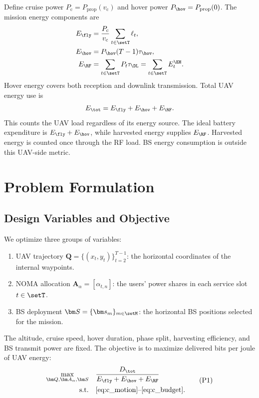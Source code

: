 Define cruise power $P_{\mathrm c}=P_{\mathrm{prop}}(v_{\mathrm c})$ and hover power $P_{\hov}=P_{\mathrm{prop}}(0)$. The mission energy components are
\begin{align}
E_{\fly}&=\frac{P_{\mathrm c}}{v_{\mathrm c}}\sum_{t\in\setT}\ell_t,
\label{eq:flight_energy}\\
E_{\hov}&=P_{\hov}(T-1)\tau_{\hov},\label{eq:hover_energy}\\
E_{\RF}&=\sum_{t\in\setT}P_t\tau_{\DL}
=\sum_{t\in\setT}E_t^{\EH}.\label{eq:rf_energy}
\end{align}
Hover energy covers both reception and downlink transmission. Total UAV energy use is
\begin{equation}
E_{\tot}=E_{\fly}+E_{\hov}+E_{\RF}.
\label{eq:total_energy}
\end{equation}
This counts the UAV load regardless of its energy source. The ideal battery expenditure is $E_{\fly}+E_{\hov}$, while harvested energy supplies $E_{\RF}$. Harvested energy is counted once through the RF load. BS energy consumption is outside this UAV-side metric.

\section{Problem Formulation}
\label{subsec:problem_formulation}
\subsection{Design Variables and Objective}
We optimize three groups of variables:
\begin{enumerate}
\item UAV trajectory $\bm Q=\{(x_t,y_t)\}_{t=2}^{T-1}$: the horizontal coordinates of the internal waypoints.
\item NOMA allocation $\bm A_{\alpha}=[\alpha_{t,n}]$: the users' power shares in each service slot $t\in\setT$.
\item BS deployment $\bm S=\{\bm s_m\}_{m\in\setM}$: the horizontal BS positions selected for the mission.
\end{enumerate}
The altitude, cruise speed, hover duration, phase split, harvesting efficiency, and BS transmit power are fixed. The objective is to maximize delivered bits per joule of UAV energy:
\begin{equation}
\begin{aligned}
\max_{\bm Q,\bm A_{\alpha},\bm S}\quad
&\frac{D_{\tot}}{E_{\fly}+E_{\hov}+E_{\RF}}\\
\mathrm{s.t.}\quad&\eqref{eq:c_motion}\text{--}\eqref{eq:c_budget}.
\end{aligned}
\tag{P1}\label{eq:P1}
\end{equation}
